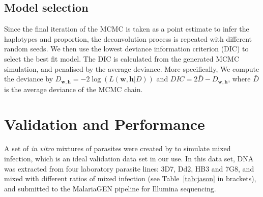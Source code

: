 \documentclass{bioinfo}
\begin{document}
\subsection{Model selection}\label{sec:method.dic}
Since the final iteration of the MCMC is taken as a point estimate to infer the haplotypes and proportion, the deconvolution process is repeated with different random seeds. We then use the lowest deviance information criterion (DIC) to select the best fit model. The DIC is calculated from the generated MCMC simulation, and penalised by the average deviance. More specifically, We compute the deviance by $ D_{\mathbf{w}, \mathbf{h}} = -2 \log( L (\mathbf{w}, \mathbf{h}|D) )$ and $DIC = 2\bar{D} - D_{\mathbf{w}, \mathbf{h}}$, where $\bar{D}$ is the average deviance of the MCMC chain. %



\section{Validation and Performance}
A set of {\it in vitro} mixtures of parasites were created by \citet{Wendler2015} to simulate mixed infection, which is an ideal validation data set in our use. In this data set, DNA was extracted from four laboratory parasite lines: 3D7, Dd2, HB3 and 7G8, and mixed with different ratios of mixed infection (see Table~\ref{tab:jason} in brackets), and submitted to the MalariaGEN pipeline \citep{MalariaGen2008} for Illumina sequencing.
\end{document}
